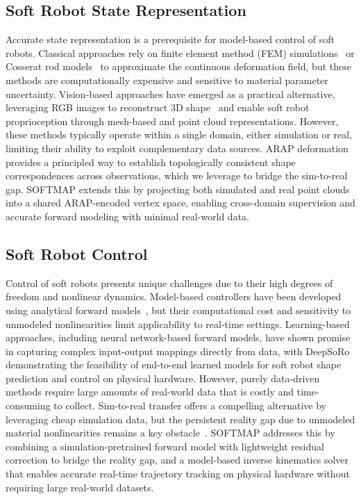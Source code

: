 \documentclass[letterpaper, 10 pt, conference]{ieeeconf}  %
\newcommand{\algname}{SOFTMAP\xspace}
\begin{document}
\subsection{Soft Robot State Representation}
Accurate state representation is a prerequisite for model-based control of soft robots. Classical approaches rely on finite element method (FEM) simulations~\cite{qin2024modeling} or Cosserat rod models~\cite{liu2020toward} to approximate the continuous deformation field, but these methods are computationally expensive and sensitive to material parameter uncertainty. Vision-based approaches have emerged as a practical alternative, leveraging RGB images to reconstruct 3D shape~\cite{yoo2023toward} and enable soft robot proprioception through mesh-based and point cloud representations. However, these methods typically operate within a single domain, either simulation or real, limiting their ability to exploit complementary data sources. ARAP deformation~\cite{sorkine2007rigid} provides a principled way to establish topologically consistent shape correspondences across observations, which we leverage to bridge the sim-to-real gap. \algname extends this by projecting both simulated and real point clouds into a shared ARAP-encoded vertex space, enabling cross-domain supervision and accurate forward modeling with minimal real-world data.

\subsection{Soft Robot Control}
Control of soft robots presents unique challenges due to their high degrees of freedom and nonlinear dynamics. Model-based controllers have been developed using analytical forward models~\cite{liu2020toward, della2023model}, but their computational cost and sensitivity to unmodeled nonlinearities limit applicability to real-time settings. Learning-based approaches, including neural network-based forward models, have shown promise in capturing complex input-output mappings directly from data, with DeepSoRo~\cite{wang2020real} demonstrating the feasibility of end-to-end learned models for soft robot shape prediction and control on physical hardware. However, purely data-driven methods require large amounts of real-world data that is costly and time-consuming to collect. Sim-to-real transfer offers a compelling alternative by leveraging cheap simulation data, but the persistent reality gap due to unmodeled material nonlinearities remains a key obstacle~\cite{yoo2023toward}. \algname addresses this by combining a simulation-pretrained forward model with lightweight residual correction to bridge the reality gap, and a model-based inverse kinematics solver that enables accurate real-time trajectory tracking on physical hardware without requiring large real-world datasets.
\end{document}
